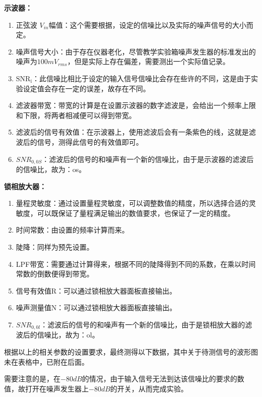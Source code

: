 \documentclass[dvipsnames, svgnames,a4paper,11pt]{article}
\begin{document}
\textbf{示波器：}
\begin{enumerate}
	\item 正弦波 $V_{in}$幅值：这个需要根据，设定的信噪比以及实际的噪声信号的大小而定。
	\item 噪声信号大小：由于存在仪器老化，尽管教学实验箱噪声发生器的标准发出的噪声为$100mV_{rms}$，但是实际上存在偏差，需要测出一个实际值记录。
	\item $\mathrm{SNR_i}$：此信噪比相比于设定的输入信号信噪比会存在些许的不同，这是由于实验设定值会存在一定的误差，故存在不同。

	\item 滤波器带宽：带宽的计算是在设置示波器的数字滤波是，会给出一个频率上限和下限，将两者相减便可以得到带宽。
	\item 滤波后的信号有效值：在示波器上，使用滤波后会有一条紫色的线，这就是滤波后的信号，测得此信号的有效值即可。
	\item $SNR_{0,0S}$：滤波后的信号的和噪声有一个新的信噪比，由于是示波器的滤波后的信噪比，故为：os。
\end{enumerate}
\textbf{锁相放大器：}
\begin{enumerate}
	\item 量程灵敏度：通过设置量程灵敏度，可以调整数值的精度，所以选择合适的灵敏度，可以既保证了量程满足输出的数值要求，也保证了一定的精度。
	\item 时间常数：由设置的频率计算而来。
	\item 陡降：同样为预先设置。
	\item LPF带宽：需要通过计算得来，根据不同的陡降得到不同的系数，在乘以时间常数的倒数便得到带宽。
	\item 信号有效值R：可以通过锁相放大器面板直接输出。
	\item 噪声测量值N：可以通过锁相放大器面板直接输出。
	\item  $SNR_{0,0l}$：滤波后的信号的和噪声有一个新的信噪比，由于是锁相放大器的滤波后的信噪比，故为：ol。
\end{enumerate}
根据以上的相关参数的设置要求，最终测得以下数据，其中关于待测信号的波形图未在表格中，已附在后面。

需要注意的是，在$-80dB$的情况，由于输入信号无法到达该信噪比的要求的数值，故打开在噪声发生器上$-80dB$的开关，从而完成实验。
\end{document}
